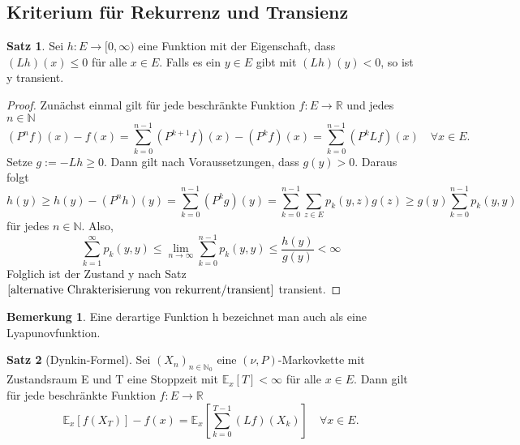 \documentclass[a4paper,12pt]{scrartcl}
\theoremstyle{definition}
\newtheorem{bem}{Bemerkung}[section]
\newtheorem{sat}{Satz}[section]
\begin{document}
\subsection{Kriterium für Rekurrenz und Transienz}
\begin{sat} 
Sei $h:E \to [0,\infty)$ eine Funktion mit der Eigenschaft, dass $(Lh)(x) \leq 0$ für alle $x \in E$. Falls es ein $y \in E$ gibt mit $(Lh)(y) < 0$, so ist y transient.
\begin{proof}
Zunächst einmal gilt für jede beschränkte Funktion $f: E \to \mathbb{R}$ und jedes $n \in \mathbb{N}$
\begin{equation*}
(P^{n}f)(x) - f(x) = \sum_{k=0}^{n-1} (P^{k+1}f)(x) - (P^{k}f)(x) = \sum_{k=0}^{n-1} (P^{k} Lf)(x) \quad \forall x \in E.
\end{equation*}
Setze $g:= -Lh \geq 0$. Dann gilt nach Voraussetzungen, dass $g(y) > 0$. Daraus folgt
\begin{equation*}
h(y) \geq h(y) - (P^{n}h)(y) = \sum_{k=0}^{n-1} (P^{k}g)(y) = \sum_{k=0}^{n-1} \sum_{z \in E} p_{k}(y,z)g(z) \geq g(y) \sum_{k=0}^{n-1} p_{k}(y,y)
\end{equation*}
für jedes $n \in \mathbb{N}$. Also,
\begin{equation*}
\sum_{k=1}^{\infty} p_{k}(y,y) \leq \lim_{n \to \infty} \sum_{k=0}^{n-1} p_{k}(y,y) \leq \dfrac{h(y)}{g(y)} < \infty
\end{equation*}
Folglich ist der Zustand y nach Satz $\ref{alternative Chrakterisierung von rekurrent/transient}$ transient.
\end{proof}
\end{sat}
\begin{bem}
Eine derartige Funktion h bezeichnet man auch als eine Lyapunovfunktion.
\end{bem}
\begin{sat}[Dynkin-Formel]
\label{Dynkin-Formel}
Sei $(X_{n})_{n \in \mathbb{N}_{0}}$ eine $(\nu,P)$-Markovkette mit Zustandsraum E und T eine Stoppzeit mit $\mathbb{E}_{x}[T]< \infty$ für alle $x \in E$. Dann gilt für jede beschränkte Funktion $f: E \to \mathbb{R}$
\begin{equation*}
\mathbb{E}_{x}[f(X_{T})] - f(x) = \mathbb{E}_{x}[\sum_{k=0}^{T-1}(Lf)(X_{k})] \quad \forall x \in E.
\end{equation*}
\end{sat}
\end{document}
